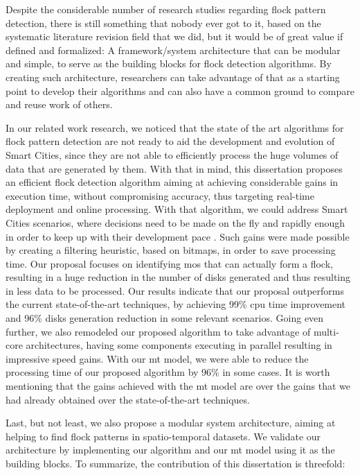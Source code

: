 Despite the considerable number of research studies regarding flock pattern detection, there is still something that
nobody ever got to it, based on the systematic literature revision field that we did, but it would be of great value if
defined and formalized: A framework/system architecture that can be modular and simple, to serve as the building blocks
for flock detection algorithms. By creating such architecture, researchers can take advantage of that as a starting
point to develop their algorithms and can also have a common ground to compare and reuse work of others.

In our related work research, we noticed that the state of the art algorithms for flock pattern detection are not ready
to aid the development and evolution of Smart Cities, since they are not able to efficiently process the huge volumes of
data that are generated by them. With that in mind, this dissertation proposes an efficient flock detection algorithm
aiming at achieving considerable gains in execution time, without compromising accuracy, thus targeting real-time
deployment and online processing. With that algorithm, we could address Smart Cities scenarios, where decisions need to
be made on the fly and rapidly enough in order to keep up with their development pace
\citep{ieeesmartcities}\citep{springersmartcities}. Such gains were made possible by creating a filtering heuristic,
based on bitmaps, in order to save processing time. Our proposal focuses on identifying \acp{mo} that can actually form
a flock, resulting in a huge reduction in the number of disks generated and thus resulting in less data to be processed.
Our results indicate that our proposal outperforms the current state-of-the-art techniques, by achieving 99\% \ac{cpu}
time improvement and 96\% disks generation reduction in some relevant scenarios. Going even further, we also remodeled
our proposed algorithm to take advantage of multi-core architectures, having some components executing in parallel
resulting in impressive speed gains. With our \ac{mt} model, we were able to reduce the processing time of our proposed
algorithm by 96\% in some cases. It is worth mentioning that the gains achieved with the \ac{mt} model are over the
gains that we had already obtained over the state-of-the-art techniques.

Last, but not least, we also propose a modular system architecture, aiming at helping to find flock patterns in
spatio-temporal datasets. We validate our architecture by implementing our algorithm and our \ac{mt} model using it as
the building blocks. To summarize, the contribution of this dissertation is threefold:

